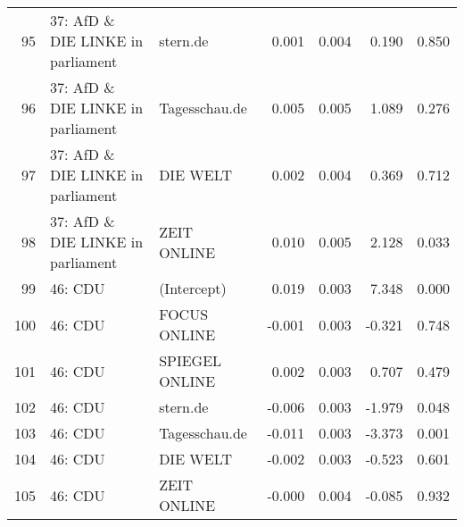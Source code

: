 \begin{table}[ht]
{\begin{tabular}{rllrrrr}
  95 & 37: AfD \& DIE LINKE in parliament & stern.de & 0.001 & 0.004 & 0.190 & 0.850 \\ 
  96 & 37: AfD \& DIE LINKE in parliament & Tagesschau.de & 0.005 & 0.005 & 1.089 & 0.276 \\ 
  97 & 37: AfD \& DIE LINKE in parliament & DIE WELT & 0.002 & 0.004 & 0.369 & 0.712 \\ 
  98 & 37: AfD \& DIE LINKE in parliament & ZEIT ONLINE & 0.010 & 0.005 & 2.128 & 0.033 \\ 
  99 & 46: CDU & (Intercept) & 0.019 & 0.003 & 7.348 & 0.000 \\ 
  100 & 46: CDU & FOCUS ONLINE & -0.001 & 0.003 & -0.321 & 0.748 \\ 
  101 & 46: CDU & SPIEGEL ONLINE & 0.002 & 0.003 & 0.707 & 0.479 \\ 
  102 & 46: CDU & stern.de & -0.006 & 0.003 & -1.979 & 0.048 \\ 
  103 & 46: CDU & Tagesschau.de & -0.011 & 0.003 & -3.373 & 0.001 \\ 
  104 & 46: CDU & DIE WELT & -0.002 & 0.003 & -0.523 & 0.601 \\ 
  105 & 46: CDU & ZEIT ONLINE & -0.000 & 0.004 & -0.085 & 0.932 \\ 
   \hline
\end{tabular}
}
\end{table}
